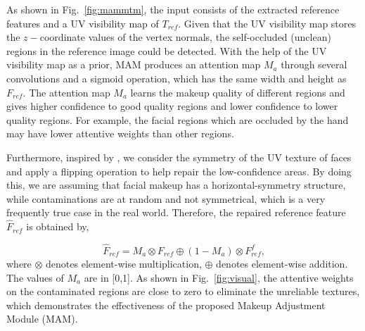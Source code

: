 \documentclass[10pt,journal,compsoc]{IEEEtran}
\begin{document}
As shown in Fig.~\ref{fig:mammtm}, the input consists of the extracted reference features and a UV visibility map of $T_{ref}$. Given that the UV visibility map stores the $z-$coordinate values of the vertex normals, the self-occluded (unclean) regions in the reference image could be detected. 
With the help of the UV visibility map as a prior, MAM produces an attention map $M_{a}$ through several convolutions and a sigmoid operation, which has the same width and height as $F_{ref}$. The attention map $M_{a}$ learns the makeup quality of different regions and gives higher confidence to good quality regions and lower confidence to lower quality regions. For example, the facial regions which are occluded by the hand may have lower attentive weights than other regions.
 
Furthermore, inspired by \cite{Wu_2020_CVPR}, we consider the symmetry of the UV texture of faces and apply a flipping operation to help repair the low-confidence areas. By doing this, we are assuming that facial makeup has a horizontal-symmetry structure, while contaminations are at random and not symmetrical, which is a very frequently true case in the real world.
Therefore, the repaired reference feature $\hat{F}_{ref}$ is obtained by, 

\begin{equation}
  \hat{F}_{ref}=M_{a} \otimes F_{ref} \oplus \left(1-M_{a}\right) \otimes F_{ref}^{f} \text{,}
  \label{con:MAM}
\end{equation}
where $\otimes$ denotes element-wise multiplication, $\oplus$ denotes element-wise addition.
The values of $M_{a}$ are in [0,1]. As shown in Fig.~\ref{fig:visual}, the attentive weights on the contaminated regions are close to zero to eliminate the unreliable textures, which demonstrates the effectiveness of the proposed Makeup Adjustment Module (MAM). 
\end{document}
